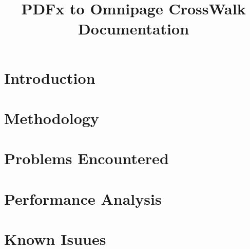 \documentclass[12pt]{scrreprt}
\title{PDFx to Omnipage CrossWalk Documentation}
\date{}
\begin{document}
\maketitle

\tableofcontents

\chapter{Introduction}
\label{section:introduction}


\chapter{Methodology}
\label{section: method}


\chapter{Problems Encountered}
\label{section:experiments}


\chapter{Performance Analysis}
\label{section:discussion}


\chapter{Known Isuues}
\label{section:conclusion}

\end{document}
